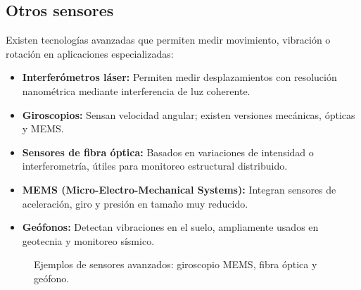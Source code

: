 \subsection{Otros sensores}
Existen tecnologías avanzadas que permiten medir movimiento, vibración o rotación en aplicaciones especializadas:
\begin{itemize}
    \item \textbf{Interferómetros láser:} Permiten medir desplazamientos con resolución nanométrica mediante interferencia de luz coherente.
    \item \textbf{Giroscopios:} Sensan velocidad angular; existen versiones mecánicas, ópticas y MEMS. 
    \item \textbf{Sensores de fibra óptica:} Basados en variaciones de intensidad o interferometría, útiles para monitoreo estructural distribuido.
    \item \textbf{MEMS (Micro-Electro-Mechanical Systems):} Integran sensores de aceleración, giro y presión en tamaño muy reducido.
    \item \textbf{Geófonos:} Detectan vibraciones en el suelo, ampliamente usados en geotecnia y monitoreo sísmico.
\end{itemize}

\begin{figure}[h!]
    \centering
    \fbox{\rule{0pt}{6cm} \rule{10cm}{0pt}}
    \caption{Ejemplos de sensores avanzados: giroscopio MEMS, fibra óptica y geófono.}
\end{figure}

















